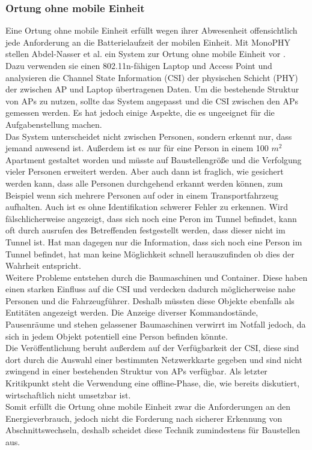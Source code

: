 \subsubsection{Ortung ohne mobile Einheit}
Eine Ortung ohne mobile Einheit erfüllt wegen ihrer Abwesenheit offensichtlich jede Anforderung an die Batterielaufzeit der mobilen Einheit.
Mit MonoPHY stellen Abdel-Nasser et al. ein System zur Ortung ohne mobile Einheit vor \cite{abdel2013monophy}. \\
Dazu verwenden sie einen 802.11n-fähigen Laptop und Access Point und analysieren die Channel State Information (CSI) der physischen Schicht (PHY) der zwischen AP und Laptop übertragenen Daten.
Um die bestehende Struktur von APs zu nutzen, sollte das System angepasst und die CSI zwischen den APs gemessen werden.
Es hat jedoch einige Aspekte, die es ungeeignet für die Aufgabenstellung machen.\\
Das System unterscheidet nicht zwischen Personen, sondern erkennt nur, dass jemand anwesend ist. 
Außerdem ist es nur für eine Person in einem 100 $m^2$ Apartment gestaltet worden und müsste auf Baustellengröße und die Verfolgung vieler Personen erweitert werden.
Aber auch dann ist fraglich, wie gesichert werden kann, dass alle Personen durchgehend erkannt werden können, zum Beispiel wenn sich mehrere Personen auf oder in einem Transportfahrzeug aufhalten.
Auch ist es ohne Identifikation schwerer Fehler zu erkennen. 
Wird fälschlicherweise angezeigt, dass sich noch eine Peron im Tunnel befindet, kann oft durch ausrufen des Betreffenden festgestellt werden, dass dieser nicht im Tunnel ist. 
Hat man dagegen nur die Information, dass sich noch eine Person im Tunnel befindet, hat man keine Möglichkeit schnell herauszufinden ob dies der Wahrheit entspricht.\\
Weitere Probleme entstehen durch die Baumaschinen und Container. 
Diese haben einen starken Einfluss auf die CSI und verdecken dadurch möglicherweise nahe Personen und die Fahrzeugführer.
Deshalb müssten diese Objekte ebenfalls als Entitäten angezeigt werden. 
Die Anzeige diverser Kommandostände, Pausenräume und stehen gelassener Baumaschinen verwirrt im Notfall jedoch, da sich in jedem Objekt potentiell eine Person befinden könnte.\\
Die Veröffentlichung beruht außerdem auf der Verfügbarkeit der CSI, diese sind dort durch die Auswahl einer bestimmten Netzwerkkarte gegeben und sind nicht zwingend in einer bestehenden Struktur von APs verfügbar.
Als letzter Kritikpunkt steht die Verwendung eine offline-Phase, die, wie bereits diskutiert, wirtschaftlich nicht umsetzbar ist. \\ 
Somit erfüllt die Ortung ohne mobile Einheit zwar die Anforderungen an den Energieverbrauch, jedoch nicht die Forderung nach sicherer Erkennung von Abschnittswechseln, deshalb scheidet diese Technik zumindestens für Baustellen aus.




